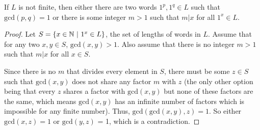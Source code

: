 \documentclass[11pt]{article}
\begin{document}
\begin{lemma}\label{nonexist}
If $L$ is not finite, then either there are two words $1^p, 1^q \in L$ such that $\mathrm{gcd}(p,q)=1$ or there is some integer $m>1$ such that $m | x$ for all $1^x \in L$.
\end{lemma}

\begin{proof}
Let $S = \{ x \in \mathbb{N} \ | \  1^x \in L \}$, the set of lengths of words in $L$. Assume that for any two $x,y \in S$, $\mathrm{gcd}(x,y) > 1$. Also assume that there is no integer $m>1$ such that $m | x$ for all $x \in S$.

Since there is no $m$ that divides every element in $S$, there must be some $z \in S$ such that $\mathrm{gcd}(x,y)$ does not share any factor $m$ with $z$ (the only other option being that every $z$ shares a factor with $\mathrm{gcd}(x,y)$ but none of these factors are the same, which means $\mathrm{gcd}(x,y)$ has an infinite number of factors which is impossible for any finite number). Thus, $\mathrm{gcd}(\mathrm{gcd}(x,y),z) = 1$. So either $\mathrm{gcd}(x,z)=1$ or $\mathrm{gcd}(y,z)$ = 1, which is a contradiction.
\end{proof}
\end{document}

